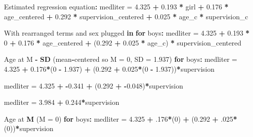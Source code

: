 \documentclass[a4paper]{book}
\newenvironment{Shaded}{\begin{snugshade}}{\end{snugshade}}
\newcommand{\KeywordTok}[1]{\textcolor[rgb]{0,0,0}{\textbf{#1}}}
\newcommand{\DataTypeTok}[1]{\textcolor[rgb]{0,0,0}{#1}}
\newcommand{\DecValTok}[1]{\textcolor[rgb]{0.00,0.00,0.00}{#1}}
\newcommand{\FloatTok}[1]{\textcolor[rgb]{0.00,0.00,0.00}{#1}}
\newcommand{\StringTok}[1]{\textcolor[rgb]{0.00,0.00,0.00}{#1}}
\newcommand{\ControlFlowTok}[1]{\textcolor[rgb]{0.00,0.00,0.00}{\textbf{#1}}}
\newcommand{\OperatorTok}[1]{\textcolor[rgb]{0.00,0.00,0.00}{\textbf{#1}}}
\newcommand{\NormalTok}[1]{#1}
\theoremstyle{definition}
\theoremstyle{definition}
\theoremstyle{definition}
\theoremstyle{remark}
\begin{document}
\begin{Shaded}
\begin{Highlighting}[]
{{{{\NormalTok{Estimated regression equation}\OperatorTok{:}\StringTok{   }
\StringTok{    }
\NormalTok{medliter =}\StringTok{ }\FloatTok{4.325} \OperatorTok{+}\StringTok{ }\FloatTok{0.193} \OperatorTok{*}\StringTok{ }\NormalTok{girl }\OperatorTok{+}\StringTok{ }\FloatTok{0.176} \OperatorTok{*}\StringTok{ }\NormalTok{age_centered }\OperatorTok{+}\StringTok{ }\FloatTok{0.292} \OperatorTok{*}\StringTok{ }\NormalTok{supervision_centered }\OperatorTok{+}\StringTok{ }
\StringTok{  }\FloatTok{0.025} \OperatorTok{*}\StringTok{ }\NormalTok{age_c }\OperatorTok{*}\StringTok{ }\NormalTok{supervision_c  }
  
\NormalTok{With rearranged terms and sex plugged }\ControlFlowTok{in} \ControlFlowTok{for}\NormalTok{ boys}\OperatorTok{:}\StringTok{  }
\StringTok{  }
\NormalTok{medliter =}\StringTok{ }\FloatTok{4.325} \OperatorTok{+}\StringTok{ }\FloatTok{0.193} \OperatorTok{*}\StringTok{ }\DecValTok{0} \OperatorTok{+}\StringTok{ }\FloatTok{0.176} \OperatorTok{*}\StringTok{ }\NormalTok{age_centered }\OperatorTok{+}\StringTok{ }
\StringTok{  }\NormalTok{(}\FloatTok{0.292}  \OperatorTok{+}\StringTok{ }\FloatTok{0.025} \OperatorTok{*}\StringTok{ }\NormalTok{age_c) }\OperatorTok{*}\StringTok{ }\NormalTok{supervision_centered  }
  
\NormalTok{Age at M }\OperatorTok{-}\StringTok{ }\KeywordTok{SD}\NormalTok{ (mean}\OperatorTok{-}\NormalTok{centered so }\DataTypeTok{M =} \DecValTok{0}\NormalTok{, }\DataTypeTok{SD =} \FloatTok{1.937}\NormalTok{) }\ControlFlowTok{for}\NormalTok{ boys}\OperatorTok{:}\StringTok{  }
\StringTok{  }
\NormalTok{medliter =}\StringTok{ }\FloatTok{4.325} \OperatorTok{+}\StringTok{ }\FloatTok{0.176}\OperatorTok{*}\NormalTok{(}\DecValTok{0} \OperatorTok{-}\StringTok{ }\FloatTok{1.937}\NormalTok{) }\OperatorTok{+}\StringTok{ }\NormalTok{(}\FloatTok{0.292} \OperatorTok{+}\StringTok{ }\FloatTok{0.025}\OperatorTok{*}\NormalTok{(}\DecValTok{0} \OperatorTok{-}\StringTok{ }\FloatTok{1.937}\NormalTok{))}\OperatorTok{*}\NormalTok{supervision  }
  
\NormalTok{medliter =}\StringTok{ }\FloatTok{4.325} \OperatorTok{+}\StringTok{ }\OperatorTok{-}\FloatTok{0.341} \OperatorTok{+}\StringTok{ }\NormalTok{(}\FloatTok{0.292} \OperatorTok{+}\StringTok{ }\OperatorTok{-}\FloatTok{0.048}\NormalTok{)}\OperatorTok{*}\NormalTok{supervision  }
  
\NormalTok{medliter =}\StringTok{ }\FloatTok{3.984} \OperatorTok{+}\StringTok{ }\FloatTok{0.244}\OperatorTok{*}\NormalTok{supervision  }
    
\NormalTok{Age at }\KeywordTok{M}\NormalTok{ (}\DataTypeTok{M =} \DecValTok{0}\NormalTok{) }\ControlFlowTok{for}\NormalTok{ boys}\OperatorTok{:}\StringTok{  }
\StringTok{  }
\NormalTok{medliter =}\StringTok{ }\FloatTok{4.325} \OperatorTok{+}\StringTok{ }\NormalTok{.}\DecValTok{176}\OperatorTok{*}\NormalTok{(}\DecValTok{0}\NormalTok{) }\OperatorTok{+}\StringTok{ }\NormalTok{(}\FloatTok{0.292} \OperatorTok{+}\StringTok{ }\NormalTok{.}\DecValTok{025}\OperatorTok{*}\NormalTok{(}\DecValTok{0}\NormalTok{))}\OperatorTok{*}\NormalTok{supervision  }
  
}}}}
\end{Highlighting}
\end{Shaded}
\end{document}
